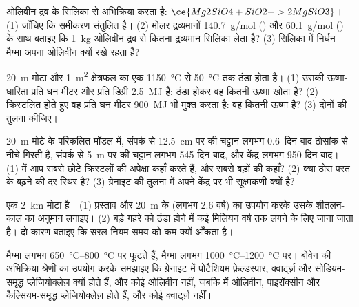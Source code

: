 \begin{exercise}[$\star\star$]\label{exo:g11:igneous-rocks:10}
ओलिवीन द्रव के सिलिका से अभिक्रिया करता है: $\ce{Mg2SiO4 + SiO2 -> 2
MgSiO3}$। (1) जाँचिए कि समीकरण संतुलित है। (2) मोलर द्रव्यमानों
\qty{140.7}{g/mol} () और \qty{60.1}{g/mol} () के साथ बताइए कि
\qty{1}{kg} ओलिवीन द्रव से कितना द्रव्यमान सिलिका लेता है? (3) सिलिका में
निर्धन मैग्मा अपना ओलिवीन क्यों रखे रहता है?
\end{exercise}

\begin{exercise}[$\star\star$]\label{exo:g11:igneous-rocks:11}
\qty{20}{m} मोटा और \qty{1}{m^2} क्षेत्रफल का एक 
\qty{1150}{\degreeCelsius} से \qty{50}{\degreeCelsius} तक ठंडा होता है। (1) उसकी ऊष्मा-धारिता
प्रति घन मीटर और प्रति डिग्री \qty{2.5}{MJ} है: ठंडा होकर वह कितनी ऊष्मा
खोता है? (2) क्रिस्टलित होते हुए वह प्रति घन मीटर \qty{900}{MJ} भी मुक्त करता है:
वह कितनी ऊष्मा है? (3) दोनों की तुलना कीजिए।
\end{exercise}

\begin{exercise}[$\star\star\star$]\label{exo:g11:igneous-rocks:12}
\qty{20}{m} मोटे  के परिकलित मॉडल में, संपर्क से
\qty{12.5}{cm} पर की चट्टान लगभग
\num{0.6}~दिन बाद ठोसांक से नीचे गिरती है, संपर्क से \qty{5}{m} पर की चट्टान लगभग 545 दिन बाद,
और केंद्र लगभग 950 दिन बाद। (1)  में आप सबसे
छोटे क्रिस्टलों की अपेक्षा कहाँ करते हैं, और सबसे बड़ों की कहाँ? (2) क्या ठोस परत के
बढ़ने की दर स्थिर है? (3) ग्रेनाइट की तुलना में  अपने
केंद्र पर भी सूक्ष्मकणी क्यों है?
\end{exercise}

\begin{exercise}[$\star\star\star$]\label{exo:g11:igneous-rocks:13}
एक  \qty{2}{km} मोटा है। (1) प्रस्ताव और
\qty{20}{m} के  (लगभग 2.6 वर्ष) का उपयोग करके उसके शीतलन-काल का अनुमान लगाइए। (2) बड़े
गहरे  को ठंडा होने में कई मिलियन वर्ष तक लगने के लिए जाना जाता है। दो
कारण बताइए कि सरल नियम समय को कम क्यों आँकता है।
\end{exercise}

\begin{exercise}[$\star\star\star$]\label{exo:g11:igneous-rocks:14}
 मैग्मा लगभग \qtyrange{650}{800}{\degreeCelsius} पर फूटते हैं, 
मैग्मा लगभग \qtyrange{1000}{1200}{\degreeCelsius} पर। बोवेन की
अभिक्रिया श्रेणी का उपयोग करके समझाइए कि ग्रेनाइट में पोटैशियम फ़ेल्डस्पार, क्वार्ट्ज़
और सोडियम-समृद्ध प्लेजियोक्लेज़ क्यों होते हैं, और कोई ओलिवीन नहीं, जबकि  में ओलिवीन,
पाइरॉक्सीन और कैल्सियम-समृद्ध प्लेजियोक्लेज़ होते हैं, और कोई क्वार्ट्ज़ नहीं।
\end{exercise}

